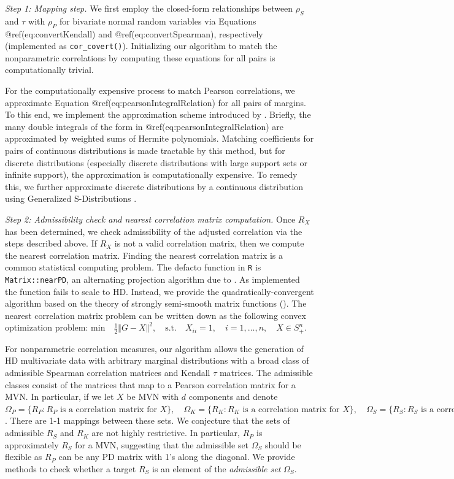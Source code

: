 \documentclass[
]{jss}
\begin{document}
\emph{Step 1: Mapping step.} We first employ the closed-form
relationships between \(\rho_S\) and \(\tau\) with \(\rho_P\) for
bivariate normal random variables via Equations @ref(eq:convertKendall)
and @ref(eq:convertSpearman), respectively (implemented as
\texttt{cor\_covert()}). Initializing our algorithm to match the
nonparametric correlations by computing these equations for all pairs is
computationally trivial.

For the computationally expensive process to match Pearson correlations,
we approximate Equation @ref(eq:pearsonIntegralRelation) for all pairs
of margins. To this end, we implement the approximation scheme
introduced by \citet{xiao2019matching}. Briefly, the many double
integrals of the form in @ref(eq:pearsonIntegralRelation) are
approximated by weighted sums of Hermite polynomials. Matching
coefficients for pairs of continuous distributions is made tractable by
this method, but for discrete distributions (especially discrete
distributions with large support sets or infinite support), the
approximation is computationally expensive. To remedy this, we further
approximate discrete distributions by a continuous distribution using
Generalized S-Distributions \citep{muino2006gs}.

\emph{Step 2: Admissibility check and nearest correlation matrix
computation.} Once \(R_X\) has been determined, we check admissibility
of the adjusted correlation via the steps described above. If \(R_X\) is
not a valid correlation matrix, then we compute the nearest correlation
matrix. Finding the nearest correlation matrix is a common statistical
computing problem. The defacto function in \texttt{R} is
\texttt{Matrix::nearPD}, an alternating projection algorithm due to
\citet{higham2002computing}. As implemented the function fails to scale
to HD. Instead, we provide the quadratically-convergent algorithm based
on the theory of strongly semi-smooth matrix functions
(\citet{qi2006quadratically}). The nearest correlation matrix problem
can be written down as the following convex optimization problem:
\(\mathrm{min} \quad \frac{1}{2} \Vert G - X \Vert^2, \quad \mathrm{s.t.} \quad X_{ii} = 1, \quad i = 1, \ldots , n, \quad X \in S_{+}^{n}\).

For nonparametric correlation measures, our algorithm allows the
generation of HD multivariate data with arbitrary marginal distributions
with a broad class of admissible Spearman correlation matrices and
Kendall \(\tau\) matrices. The admissible classes consist of the
matrices that map to a Pearson correlation matrix for a MVN. In
particular, if we let \(X\) be MVN with \(d\) components and denote
\(\Omega_P = \{ R_P : R_P \textrm{ is a correlation matrix for } X \}, \quad \Omega_K = \{ R_K : R_K \textrm{ is a correlation matrix for } X \}, \quad \Omega_S = \{ R_S : R_S \textrm{ is a correlation matrix for } X \}\).
There are 1-1 mappings between these sets. We conjecture that the sets
of admissible \(R_S\) and \(R_K\) are not highly restrictive. In
particular, \(R_P\) is approximately \(R_S\) for a MVN, suggesting that
the admissible set \(\Omega_S\) should be flexible as \(R_P\) can be any
PD matrix with 1's along the diagonal. We provide methods to check
whether a target \(R_S\) is an element of the \emph{admissible set}
\(\Omega_S\).
\end{document}
